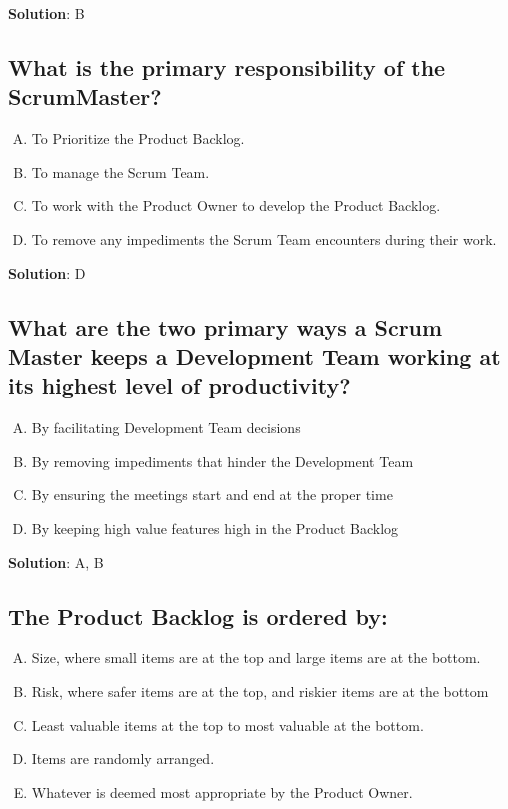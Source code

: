 \textbf{Solution}: B


\subsection{What is the primary responsibility of the ScrumMaster?}
\begin{enumerate}[A)]
  \item To Prioritize the Product Backlog.
  \item To manage the Scrum Team.
  \item To work with the Product Owner to develop the Product Backlog.
  \item To remove any impediments the Scrum Team encounters during their work.
\end{enumerate}


\textbf{Solution}: D


\subsection{What are the two primary ways a Scrum Master keeps a Development Team working at its highest level of productivity?}
\begin{enumerate}[A)]
  \item By facilitating Development Team decisions
  \item By removing impediments that hinder the Development Team
  \item By ensuring the meetings start and end at the proper time
  \item By keeping high value features high in the Product Backlog
\end{enumerate}


\textbf{Solution}: A, B


\subsection{The Product Backlog is ordered by:}
\begin{enumerate}[A)]
  \item Size, where small items are at the top and large items are at the bottom.
  \item Risk, where safer items are at the top, and riskier items are at the bottom
  \item Least valuable items at the top to most valuable at the bottom.
  \item Items are randomly arranged.
  \item Whatever is deemed most appropriate by the Product Owner.
\end{enumerate}


